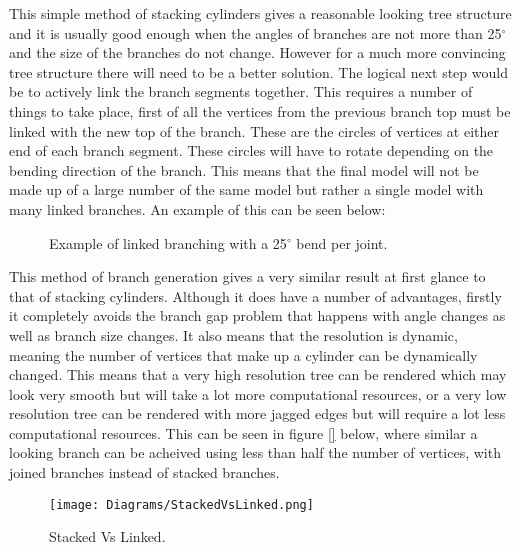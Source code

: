 \noindent
This simple method of stacking cylinders gives a reasonable looking tree structure and it is usually good enough when the angles of branches are not more than 25$^{\circ}$ and the size of the branches do not change. However for a much more convincing tree structure there will need to be a better solution. The logical next step would be to actively link the branch segments together. This requires a number of things to take place, first of all the vertices from the previous branch top must be linked with the new top of the branch. These are the circles of vertices at either end of each branch segment. These circles will have to rotate depending on the bending direction of the branch. This means that the final model will not be made up of a large number of the same model but rather a single model with many linked branches. An example of this can be seen below:

\begin{figure}[htbp]
	{\centering
		\vspace{7px}
		\setlength{\fboxrule}{1pt}
		\caption{Example of linked branching with a 25$^{\circ}$ bend per joint.}
	}
\end{figure}
\FloatBarrier

\noindent
This method of branch generation gives a very similar result at first glance to that of stacking cylinders. Although it does have a number of advantages, firstly it completely avoids the branch gap problem that happens with angle changes as well as branch size changes. It also means that the resolution is dynamic, meaning the number of vertices that make up a cylinder can be dynamically changed. This means that a very high resolution tree can be rendered which may look very smooth but will take a lot more computational resources, or a very low resolution tree can be rendered with more jagged edges but will require a lot less computational resources. This can be seen in figure \ref{} below, where similar a looking branch can be acheived using less than half the number of vertices, with joined branches instead of stacked branches.

\begin{figure}[htbp]
	{\centering
		\vspace{7px}
		\texttt{[image: Diagrams/StackedVsLinked.png]}
		\caption{Stacked Vs Linked.}
	}
\end{figure}
\FloatBarrier



